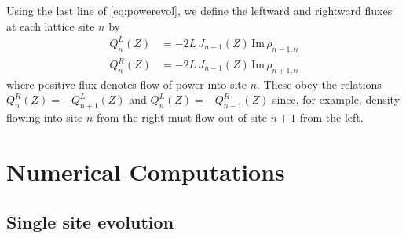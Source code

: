 \documentclass[reprint, amsmath,amssymb,aps,pre]{revtex4-2}
\begin{document}
Using the last line of \cref{eq:powerevol}, we define the leftward and rightward fluxes at each lattice site $n$ by
\begin{equation}
\begin{aligned}
Q_n^L(Z) &= -2L\,J_{n-1}(Z)\,\text{Im}\,\rho_{n-1,n} \\
Q_n^R(Z) &= -2L\,J_{n-1}(Z)\,\text{Im}\,\rho_{n+1,n} 
\end{aligned}
\end{equation}
where positive flux denotes flow of power into site $n$. These obey the relations $Q_n^R(Z) = -Q_{n+1}^L(Z)$ and $Q_n^L(Z) = -Q_{n-1}^R(Z)$ since, for example, density flowing into site $n$ from the right must flow out of site $n+1$ from the left.

\section{Numerical Computations}

\subsection{Single site evolution}\label{sec:singlesite}
\end{document}
